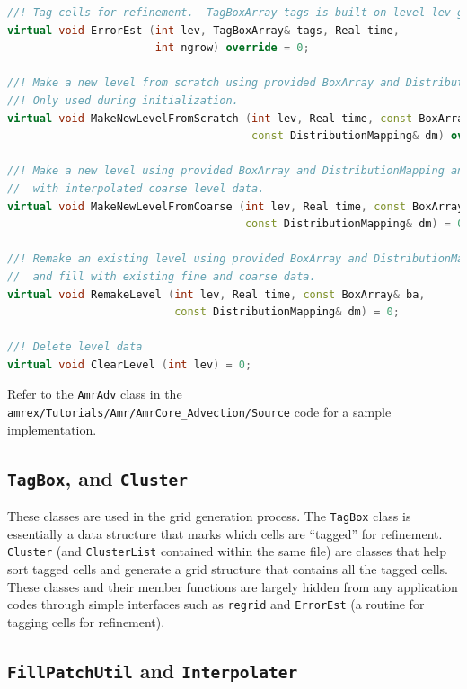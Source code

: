 \begin{lstlisting}[language=cpp]
//! Tag cells for refinement.  TagBoxArray tags is built on level lev grids.
virtual void ErrorEst (int lev, TagBoxArray& tags, Real time, 
                       int ngrow) override = 0;

//! Make a new level from scratch using provided BoxArray and DistributionMapping.
//! Only used during initialization.
virtual void MakeNewLevelFromScratch (int lev, Real time, const BoxArray& ba, 
                                      const DistributionMapping& dm) override = 0;

//! Make a new level using provided BoxArray and DistributionMapping and fill 
//  with interpolated coarse level data.
virtual void MakeNewLevelFromCoarse (int lev, Real time, const BoxArray& ba, 
                                     const DistributionMapping& dm) = 0;

//! Remake an existing level using provided BoxArray and DistributionMapping 
//  and fill with existing fine and coarse data.
virtual void RemakeLevel (int lev, Real time, const BoxArray& ba, 
                          const DistributionMapping& dm) = 0;

//! Delete level data
virtual void ClearLevel (int lev) = 0;
\end{lstlisting}
Refer to the {\tt AmrAdv} class in the {\tt amrex/Tutorials/Amr/AmrCore\_Advection/Source} 
code for a sample implementation.

\subsection{{\tt TagBox}, and {\tt Cluster}}
These classes are used in the grid generation process.
The {\tt TagBox} class is essentially a data structure that marks which
cells are ``tagged'' for refinement.
{\tt Cluster} (and {\tt ClusterList} contained within the same file) are classes
that help sort tagged cells and generate a grid structure that contains all
the tagged cells.  These classes and their member functions are largely
hidden from any application codes through simple interfaces
such as {\tt regrid} and {\tt ErrorEst} (a routine for tagging cells for refinement).

\subsection{{\tt FillPatchUtil} and {\tt Interpolater}}\label{sec:amrcore:fillpatch}

